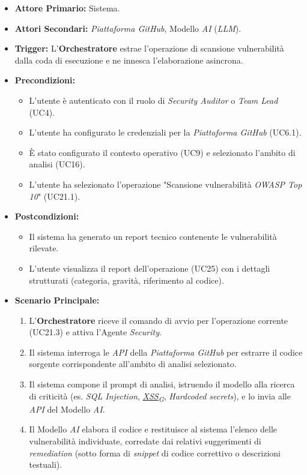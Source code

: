 \documentclass[12pt, a4paper]{article}
\newcommand{\urlglossario}{https://skynetunigroup.github.io/Code_Guardian/Documentazione/PB/glossario_v2.0.0.pdf} %
\newcommand{\glo}[2]{\href{\urlglossario\#nameddest=#2}{#1\textsubscript{G}}}
\begin{document}
\begin{itemize}
    \item \textbf{Attore Primario:} Sistema.
    \item \textbf{Attori Secondari:} \textit{Piattaforma GitHub}, Modello \textit{AI} (\textit{LLM}).
    \item \textbf{Trigger:} L'\textbf{Orchestratore} estrae l'operazione di scansione vulnerabilità dalla coda di esecuzione e ne innesca l'elaborazione asincrona.
    \item \textbf{Precondizioni:}
    \begin{itemize}
        \item L'utente è autenticato con il ruolo di \textit{Security Auditor} o \textit{Team Lead} (UC4).
        \item L'utente ha configurato le credenziali per la \textit{Piattaforma GitHub} (UC6.1).
        \item È stato configurato il contesto operativo (UC9) e selezionato l'ambito di analisi (UC16).
        \item L'utente ha selezionato l'operazione "Scansione vulnerabilità \textit{OWASP Top 10}" (UC21.1).
    \end{itemize}
    \item \textbf{Postcondizioni:}
    \begin{itemize}
        \item Il sistema ha generato un report tecnico contenente le vulnerabilità rilevate.
        \item L'utente visualizza il report dell'operazione (UC25) con i dettagli strutturati (categoria, gravità, riferimento al codice).
    \end{itemize}
    \item \textbf{Scenario Principale:}
    \begin{enumerate}
        \item L'\textbf{Orchestratore} riceve il comando di avvio per l'operazione corrente (UC21.3) e attiva l'Agente \textit{Security}.
        \item Il sistema interroga le \textit{API} della \textit{Piattaforma GitHub} per estrarre il codice sorgente corrispondente all'ambito di analisi selezionato.
        \item Il sistema compone il prompt di analisi, istruendo il modello alla ricerca di criticità (es. \textit{SQL Injection}, \textit{\glo{XSS}{xss}}, \textit{Hardcoded secrets}), e lo invia alle \textit{API} del Modello \textit{AI}.
        \item Il Modello \textit{AI} elabora il codice e restituisce al sistema l'elenco delle vulnerabilità individuate, corredate dai relativi suggerimenti di \textit{remediation} (sotto forma di \textit{snippet} di codice correttivo o descrizioni testuali).

\end{enumerate}
\end{itemize}
\end{document}
